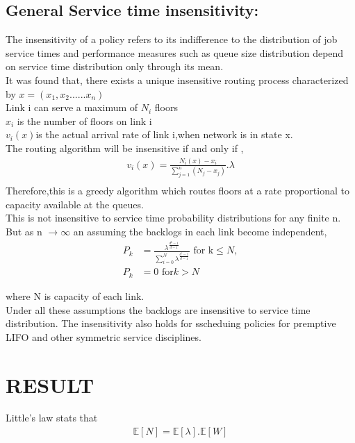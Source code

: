 \documentclass[a4paper,english,12pt]{article}
\begin{document}
\subsection{General Service time insensitivity:}
The insensitivity of a policy refers to its indifference to the distribution of job service times and performance measures such as queue size distribution depend on service time distribution only through its mean.\\
It was found that, there exists a unique insensitive routing process characterized by $x=(x_1,x_2......x_n)$\\
Link i can serve a maximum of $N_i$ floors\\
$x_i$ is the number of floors on link i\\
$v_i{(x)} $is the actual arrival rate of link i,when network is in state x.\\
The routing algorithm will be insensitive if and only if ,\\
\begin{align*}
v_i{(x)}=\frac{N_i(x)-x_i}{\sum_{j=1}^{n}(N_j-x_j)}.\lambda\\ 
\end{align*}
Therefore,this is a greedy algorithm which routes floors at a rate proportional to capacity available at the queues.\\
This is not insensitive to service time probability distributions for any finite n.\\
But as n $\longrightarrow \infty$ an assuming the backlogs in each link become independent,\\
\begin{align*}
P_k&=\frac{\lambda^{\frac{d^{k}-1}{d-1}}}{\sum_{i=0}^{N}\lambda^\frac{d^{i}-1}{d-1}}\text{                    for k$\le N,$}\\
 P_k &=0\text{ for} k>N
\end{align*}

where N is capacity of each link.\\
Under all these assumptions the backlogs are insensitive to service time distribution.
The insensitivity also holds for sscheduing policies for premptive LIFO and other symmetric service disciplines.
\section{RESULT}
Little's law stats that 
\begin{align*}
\mathbb{E}[N] = \mathbb{E}[\lambda].\mathbb{E}[W]\\
\end{align*}
\end{document}
